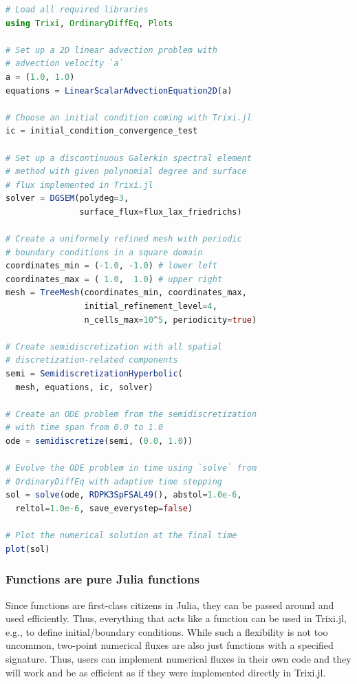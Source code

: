 \documentclass{juliacon}
\makeatletter
\newcommand{\eg}[0]{{e.g.\@}\xspace}
\newcommand{\trixi}{Trixi.jl\xspace}
\makeatother
\begin{document}
\begin{lstlisting}[language = Julia]
# Load all required libraries
using Trixi, OrdinaryDiffEq, Plots

# Set up a 2D linear advection problem with
# advection velocity `a`
a = (1.0, 1.0)
equations = LinearScalarAdvectionEquation2D(a)

# Choose an initial condition coming with Trixi.jl
ic = initial_condition_convergence_test

# Set up a discontinuous Galerkin spectral element
# method with given polynomial degree and surface
# flux implemented in Trixi.jl
solver = DGSEM(polydeg=3,
               surface_flux=flux_lax_friedrichs)

# Create a uniformely refined mesh with periodic
# boundary conditions in a square domain
coordinates_min = (-1.0, -1.0) # lower left
coordinates_max = ( 1.0,  1.0) # upper right
mesh = TreeMesh(coordinates_min, coordinates_max,
                initial_refinement_level=4,
                n_cells_max=10^5, periodicity=true)

# Create semidiscretization with all spatial
# discretization-related components
semi = SemidiscretizationHyperbolic(
  mesh, equations, ic, solver)

# Create an ODE problem from the semidiscretization
# with time span from 0.0 to 1.0
ode = semidiscretize(semi, (0.0, 1.0))

# Evolve the ODE problem in time using `solve` from
# OrdinaryDiffEq with adaptive time stepping
sol = solve(ode, RDPK3SpFSAL49(), abstol=1.0e-6,
  reltol=1.0e-6, save_everystep=false)

# Plot the numerical solution at the final time
plot(sol)
\end{lstlisting}

\subsubsection{Functions are pure Julia functions}

Since functions are first-class citizens in Julia, they can be passed around
and used efficiently. Thus, everything that acts like a function can be used
in \trixi, \eg, to define initial/boundary conditions. While such a flexibility
is not too uncommon, two-point numerical fluxes are also just functions with a
specified signature. Thus, users can implement numerical fluxes in their
own code and they will work and be as efficient as if they were implemented
directly in \trixi.
\end{document}
